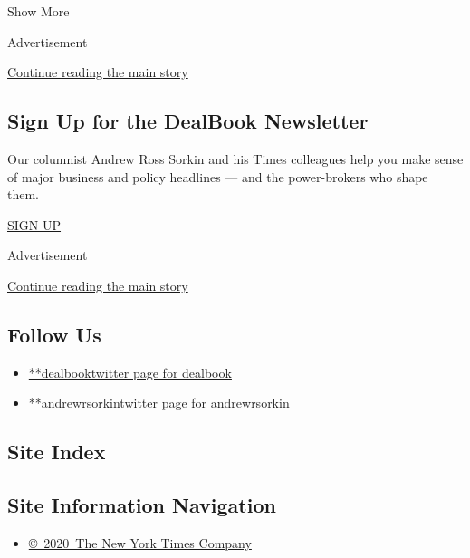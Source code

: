 Show More

Advertisement

\protect\hyperlink{after-mid2}{Continue reading the main story}

\hypertarget{sign-up-for-the-dealbook-newsletter}{%
\subsection{Sign Up for the DealBook
Newsletter}\label{sign-up-for-the-dealbook-newsletter}}

Our columnist Andrew Ross Sorkin and his Times colleagues help you make
sense of major business and policy headlines --- and the power-brokers
who shape them.

\href{/newsletters/signup/DK}{SIGN UP}

Advertisement

\protect\hyperlink{after-mktg}{Continue reading the main story}

\hypertarget{follow-us}{%
\subsection{Follow Us}\label{follow-us}}

\begin{itemize}
\tightlist
\item
  \href{https://twitter.com/dealbook}{**dealbooktwitter page for
  dealbook}
\item
  \href{https://twitter.com/andrewrsorkin}{**andrewrsorkintwitter page
  for andrewrsorkin}
\end{itemize}

\hypertarget{site-index}{%
\subsection{Site Index}\label{site-index}}

\hypertarget{site-information-navigation}{%
\subsection{Site Information
Navigation}\label{site-information-navigation}}

\begin{itemize}
\tightlist
\item
  \href{https://help.nytimes.com/hc/en-us/articles/115014792127-Copyright-notice}{©~2020~The
  New York Times Company}
\end{itemize}

